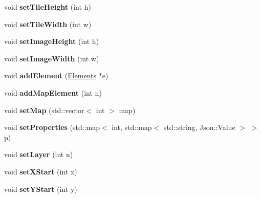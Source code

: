 \begin{DoxyCompactItemize}
\item 
\hypertarget{class_map_a7faf61ea4f43b4c1e15bd3d8744366b6}{void {\bfseries set\+Tile\+Height} (int h)}\label{class_map_a7faf61ea4f43b4c1e15bd3d8744366b6}

\item 
\hypertarget{class_map_a88d4cda4b476ae4ee3487786b0feccd9}{void {\bfseries set\+Tile\+Width} (int w)}\label{class_map_a88d4cda4b476ae4ee3487786b0feccd9}

\item 
\hypertarget{class_map_ada51d21543808fa10d085c3c09bda7f9}{void {\bfseries set\+Image\+Height} (int h)}\label{class_map_ada51d21543808fa10d085c3c09bda7f9}

\item 
\hypertarget{class_map_a38f4a514bf3993ef816b6feda56ab36e}{void {\bfseries set\+Image\+Width} (int w)}\label{class_map_a38f4a514bf3993ef816b6feda56ab36e}

\item 
\hypertarget{class_map_a8b3a39287db471b6faec3cfb281b2da6}{void {\bfseries add\+Element} (\hyperlink{class_elements}{Elements} $\ast$e)}\label{class_map_a8b3a39287db471b6faec3cfb281b2da6}

\item 
\hypertarget{class_map_a4352368e79238539142cf1397c992c65}{void {\bfseries add\+Map\+Element} (int n)}\label{class_map_a4352368e79238539142cf1397c992c65}

\item 
\hypertarget{class_map_a6a1130ac8c3c4d6dcf636759aa970b9b}{void {\bfseries set\+Map} (std\+::vector$<$ int $>$ map)}\label{class_map_a6a1130ac8c3c4d6dcf636759aa970b9b}

\item 
\hypertarget{class_map_a391c92153c0a6134bec05ae442d4fff0}{void {\bfseries set\+Properties} (std\+::map$<$ int, std\+::map$<$ std\+::string, Json\+::\+Value $>$ $>$ p)}\label{class_map_a391c92153c0a6134bec05ae442d4fff0}

\item 
\hypertarget{class_map_aa120a297bb17cc623e59f65c6d3c4d85}{void {\bfseries set\+Layer} (int n)}\label{class_map_aa120a297bb17cc623e59f65c6d3c4d85}

\item 
\hypertarget{class_map_ad94fb4c20db0ee965bf2f3509a4a3d3a}{void {\bfseries set\+X\+Start} (int x)}\label{class_map_ad94fb4c20db0ee965bf2f3509a4a3d3a}

\item 
\hypertarget{class_map_a395377ee2e6e76099d4b2b90c0726a26}{void {\bfseries set\+Y\+Start} (int y)}\label{class_map_a395377ee2e6e76099d4b2b90c0726a26}


\end{DoxyCompactItemize}
